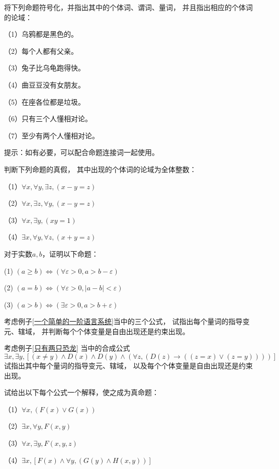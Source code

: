 \begin{prob}[量词的使用]
将下列命题符号化，并指出其中的个体词、谓词、量词，
并且指出相应的个体词的论域：

（1）乌鸦都是黑色的。

（2）每个人都有父亲。

（3）兔子比乌龟跑得快。

（4）曲豆豆没有女朋友。

（5）在座各位都是垃圾。

（6）只有三个人懂相对论。

（7）至少有两个人懂相对论。
\end{prob}

提示：如有必要，可以配合命题连接词一起使用。\vs

\begin{prob}判断下列命题的真假，
其中出现的个体词的论域为全体整数：

（1）$\forall x,\forall y,\exists z,(x-y=z)$

（2）$\forall x,\exists z,\forall y,(x-y=z)$

（3）$\forall x,\exists y,(xy=1)$

（4）$\exists x,\forall y,\forall z,(x+y=z)$
\end{prob}\vs

\begin{prob}[分析学基本原理]
对于实数$a,b$，证明以下命题：

(1) $(a\geq b)\Leftrightarrow(\forall\varepsilon>0,a>b-\varepsilon)$

(2) $(a=b)\Leftrightarrow(\forall\varepsilon>0,|a-b|<\varepsilon)$

(3) $(a>b)\Leftrightarrow(\exists\varepsilon>0,a>b+\varepsilon)$

\end{prob}\vs

\begin{prob}考虑例子\ref{一个简单的一阶语言系统}当中的三个公式，
试指出每个量词的指导变元、辖域，
并判断每个个体变量是自由出现还是约束出现。
\end{prob}\vs

\begin{prob}考虑例子\ref{只有两只恐龙}
当中的合成公式
$$\exists x,\exists y,
[(x\neq y)\wedge D(x)\wedge D(y)\wedge
(\forall z,(D(z)\rightarrow((z=x)\vee(z=y))))]$$
试指出其中每个量词的指导变元、辖域，
以及每个个体变量是自由出现还是约束出现。
\end{prob}\vs

\begin{prob}试给出以下每个公式一个解释，使之成为真命题：

（1）$\forall x,(F(x)\vee G(x))$

（2）$\exists x,\forall y,F(x,y)$

（3）$\forall x,\exists y,F(x,y,z)$

（4）$\exists x,[F(x)\wedge\forall y,(G(y)\wedge H(x,y))]$
\end{prob}\vs

